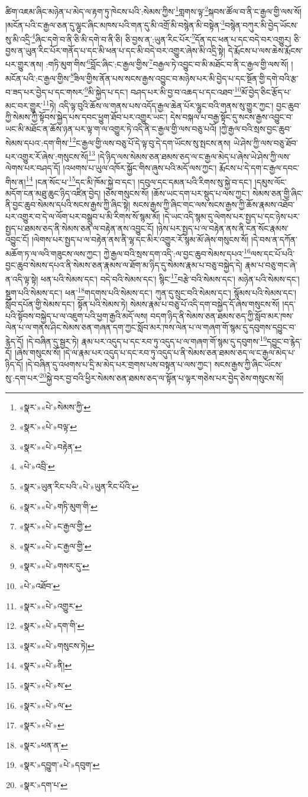 ཚིག་འཇམ་ཞིང་མཉེན་པ་མེད་ལ་རྟག་ཏུ་ཁེངས་པའི་:སེམས་ཀྱིས་\footnote{«སྣར་»«པེ་»སེམས་ཀྱི་}གླགས་ལྟ་\footnote{«སྣར་»«པེ་»བལྟ་}སྐབས་ཚོལ་བ་ནི་ང་རྒྱལ་གྱི་ལས་སོ། །མངོན་པའི་ང་རྒྱལ་ཅན་དུ་ལྷུང་ཞིང་མཁས་པའི་གན་དུ་མི་འགྲོ་མི་བསྙེན་མི་བསྟེན་\footnote{«སྣར་»«པེ་»བརྟེན་}བསྙེན་བཀུར་མི་བྱེད་ཡོངས་སུ་མི་འདྲི་\footnote{«པེ་»འབྲི་}ཞིང་དགེ་བ་ནི་ཅི་མི་དགེ་བ་ནི་ཅི། ཅི་བྱས་ན་:ཡུན་རིང་པོར་\footnote{«སྣར་»ཡུན་རིང་པའི་«པེ་»ཡུན་རིང་པོའི་}དོན་དང་ཕན་པ་དང་བདེ་བར་འགྱུར། ཅི་བྱས་ན་ཡུན་རིང་པོར་གནོད་པ་དང་མི་ཕན་པ་དང་མི་བདེ་བར་འགྱུར་ཞེས་མི་འདྲི་སྟེ། དེ་རྨོངས་པ་ལས་ཆེས་རྨོངས་པར་གྱུར་ནས། :གཏི་མུག་གིས་\footnote{«སྣར་»«པེ་»གཏི་མུག་གི་}བློང་ཞིང་:ང་རྒྱལ་གྱིས་\footnote{«སྣར་»«པེ་»ང་རྒྱལ་གྱི་}བརྒྱལ་ཏེ་འབྱུང་བ་མི་མཐོང་བ་ནི་ང་རྒྱལ་གྱི་ལས་སོ། །མངོན་པའི་:ང་རྒྱལ་གྱིས་\footnote{«སྣར་»«པེ་»ང་རྒྱལ་གྱི་}ཟིལ་གྱིས་ནོན་པས་སངས་རྒྱས་འབྱུང་བ་མཉེས་པར་མི་བྱེད་པ་དང་སྔོན་གྱི་དགེ་བའི་རྩ་བ་ཟད་པར་བྱེད་པ་དང་གསར་\footnote{«སྣར་»«པེ་»གསར་དུ་}མི་སྐྱེད་པ་དང་། བཤད་པར་མི་བྱ་བ་འཆད་པ་དང་འཐབ་\footnote{«པེ་»འཐོབ་}མོ་བྱེད་ཅིང་རྩོད་པ་མང་བར་གྱུར་\footnote{«སྣར་»«པེ་»འགྱུར་}ཏེ། འདི་ལྟ་བུའི་ཆོས་ལ་གནས་པས་འདོད་རྒྱལ་ཆེན་པོར་ལྷུང་བའི་གནས་སུ་གྱུར་ཀྱང་། བྱང་ཆུབ་ཀྱི་སེམས་ཀྱི་སྟོབས་སྐྱེད་པས་དབང་ཕྱུག་ཐོབ་པར་འགྱུར་ཡང་། དེས་བསྐལ་པ་བརྒྱ་སྟོང་དུ་སངས་རྒྱས་འབྱུང་བ་ཡང་མི་མཐོང་ན་ཆོས་ཉན་པར་ལྟ་ག་ལ་འགྱུར་ཏེ་འདི་ནི་ང་རྒྱལ་གྱི་ལས་བཅུ་པའོ། །ཀྱེ་རྒྱལ་བའི་སྲས་བྱང་ཆུབ་སེམས་དཔའ་:དག་གིས་\footnote{«སྣར་»«པེ་»དག་གི་}ང་རྒྱལ་གྱི་ལས་བཅུ་པོ་དེ་ལྟ་བུ་དེ་དག་ཡོངས་སུ་སྤངས་ནས། ཡེ་ཤེས་ཀྱི་ལས་བཅུ་ཐོབ་པར་འགྱུར་རོ་ཞེས་:གསུངས་སོ།\footnote{«སྣར་»«པེ་»གསུངས་ཏེ།} །དེ་ཉིད་ལས་སེམས་ཅན་ཐམས་ཅད་ལ་ང་རྒྱལ་མེད་པ་ཞེས་ཡེ་ཤེས་ཀྱི་ལས་ལེགས་པར་བཤད་དོ། །འཕགས་པ་ཡུལ་འཁོར་སྐྱོང་གིས་ཞུས་པའི་མདོ་ལས་ཀྱང་། རྨོངས་པ་དེ་དག་ང་རྒྱལ་དབང་གིས་ན།\footnote{«སྣར་»«པེ་»ནི།} །ངན་སོང་པ་\footnote{«སྣར་»«པེ་»ས་}དང་མི་ཁོམ་སྐྱེ་བ་དང་། །དབུལ་དང་དམན་པའི་རིགས་སུ་སྐྱེ་བ་དང་། །དམུས་ལོང་མདོག་ངན་མཐུ་ཆུང་ཉིད་འཛིན་བྱེད། །ཅེས་གསུངས་སོ། །ཆོས་ཡང་དག་པར་སྡུད་པ་ལས་ཀྱང་། སེམས་ཅན་གྱི་ཞིང་ནི་བྱང་ཆུབ་སེམས་དཔའི་སངས་རྒྱས་ཀྱི་ཞིང་སྟེ། སངས་རྒྱས་ཀྱི་ཞིང་གང་ལས་སངས་རྒྱས་ཀྱི་ཆོས་རྣམས་འཐོབ་པར་འགྱུར་བ་དེ་ལ་ལོག་པར་བསྒྲུབ་པ་མི་རིགས་སོ་སྙམ་མོ། །དེ་ཡང་འདི་སྙམ་དུ་ལེགས་པར་སྤྱད་པ་དང་ཉེས་པར་སྤྱད་པ་ཐམས་ཅད་ནི་སེམས་ཅན་ལ་བརྟེན་ནས་འབྱུང་ངོ། །ཉེས་པར་སྤྱད་པ་ལ་བརྟེན་ནས་ནི་ངན་སོང་རྣམས་འབྱུང་ངོ། །ལེགས་པར་སྤྱད་པ་ལ་བརྟེན་ནས་ནི་ལྷ་དང་མིར་འགྱུར་རོ་སྙམ་མོ་ཞེས་གསུངས་སོ། །དེ་བས་ན་དཀོན་མཆོག་ཏ་ལ་ལའི་གཟུངས་ལས་ཀྱང་། ཀྱེ་རྒྱལ་བའི་སྲས་དག་འདི་:ལ་བྱང་ཆུབ་སེམས་དཔའ་\footnote{«སྣར་»«པེ་»ལ་}ལས་དང་པོ་པའི་བྱང་ཆུབ་སེམས་དཔའ་ནི་སེམས་ཅན་རྣམས་ལ་ཐོག་མ་ཉིད་དུ་སེམས་རྣམ་པ་བཅུ་བསྐྱེད་དེ། རྣམ་པ་བཅུ་གང་ཞེ་ན་འདི་ལྟ་སྟེ། ཕན་པའི་སེམས་དང་། བདེ་བའི་སེམས་དང་། སྙིང་\footnote{«སྣར་»«པེ་»}བརྩེ་བའི་སེམས་དང་། མཉེན་པའི་སེམས་དང་། སྡུག་པའི་སེམས་དང་། ཕན་\footnote{«སྣར་»ཕན་ན་}གདགས་པའི་སེམས་དང་། ཀུན་དུ་སྲུང་བའི་སེམས་དང་། སྙོམས་པའི་སེམས་དང་། སློབ་དཔོན་གྱི་སེམས་དང་། སྟོན་པའི་སེམས་ཏེ། སེམས་རྣམ་པ་བཅུ་པོ་འདི་དག་བསྐྱེད་དོ་ཞེས་གསུངས་སོ། །དད་པའི་སྟོབས་བསྐྱེད་པ་ལ་འཇུག་པའི་ཕྱག་རྒྱའི་མདོ་ལས། བདག་ཉིད་ནི་སེམས་ཅན་ཐམས་ཅད་ཀྱི་སློབ་མར་ཁས་ལེན་པ་ལ་གནས་ཤིང་སེམས་ཅན་གཞན་དག་ཀྱང་སློབ་མར་ཁས་ལེན་པ་ལ་གཞག་གོ་སྙམ་དུ་དབུགས་དབྱུང་བ་རྙེད་དོ། །དེ་བཞིན་དུ་སྦྱར་ཏེ། རྣམ་པར་འདུད་པ་དང་རབ་ཏུ་འདུད་པ་ལ་གཞག་གོ་སྙམ་དུ་དབུགས་\footnote{«སྣར་»དབྱུག་«པེ་»དབུག་}དབྱུང་བ་རྙེད་དོ། །ཞེས་གསུངས་སོ། །དེ་ལ་རྣམ་པར་འདུད་པ་དང་རབ་ཏུ་འདུད་པ་ནི་སེམས་ཅན་ཐམས་ཅད་ལ་ང་རྒྱལ་མེད་པ་ཉིད་དོ། །དེ་བཞིན་དུ་འཕགས་པ་དྲི་མ་མེད་པར་གྲགས་པས་བསྟན་པ་ལས་ཀྱང་། སངས་རྒྱས་ཀྱི་ཞིང་ཡོངས་སུ་:དག་པར་\footnote{«སྣར་»དག་པ་}སྐྱེ་བར་བྱ་བའི་ཕྱིར་སེམས་ཅན་ཐམས་ཅད་ལ་སྟོན་པ་ལྟར་གཅེས་པར་བྱེད་ཅེས་གསུངས་སོ། 